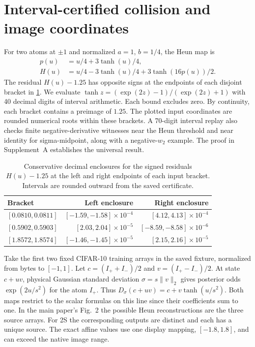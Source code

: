 \documentclass[10pt,twocolumn,letterpaper]{article}
\begin{document}
\section{Interval-certified collision and image coordinates}
\label{sec:exact}
For two atoms at $\pm1$ and normalized $a=1$, $b=1/4$, the Heun map is
\[
 \begin{aligned}
 p(u)&=u/4+3\tanh(u)/4,\\
 H(u)&=u/4-3\tanh(u)/4+3\tanh(16p(u))/2.
 \end{aligned}
\]
The residual $H(u)-1.25$ has opposite signs at the endpoints of each disjoint bracket in \cref{tab:brackets}. We evaluate $\tanh z=(\exp(2z)-1)/(\exp(2z)+1)$ with 40 decimal digits of interval arithmetic. Each bound excludes zero. By continuity, each bracket contains a preimage of $1.25$. The plotted input coordinates are rounded numerical roots within these brackets. A 70-digit interval replay also checks finite negative-derivative witnesses near the Heun threshold and near identity for sigma-midpoint, along with a negative-$w_2$ example. The proof in Supplement~A establishes the universal result.

\begin{table}[t]
\centering\footnotesize
\setlength{\tabcolsep}{2.5pt}
\begin{tabular}{@{}lrr@{}}\toprule
Bracket & Left enclosure & Right enclosure\\\midrule
$[0.0810,0.0811]$ & $[-1.59,-1.58]\times10^{-4}$ & $[4.12,4.13]\times10^{-4}$\\
$[0.5902,0.5903]$ & $[2.03,2.04]\times10^{-5}$ & $[-8.59,-8.58]\times10^{-6}$\\
$[1.8572,1.8574]$ & $[-1.46,-1.45]\times10^{-5}$ & $[2.15,2.16]\times10^{-5}$\\
\bottomrule\end{tabular}
\caption{Conservative decimal enclosures for the signed residuals $H(u)-1.25$ at the left and right endpoints of each input bracket. Intervals are rounded outward from the saved certificate.}
\label{tab:brackets}
\end{table}

Take the first two fixed CIFAR-10 training arrays in the saved fixture, normalized from bytes to $[-1,1]$. Let $c=(I_++I_-)/2$ and $v=(I_+-I_-)/2$. At state $c+uv$, physical Gaussian standard deviation $\sigma=s\|v\|_2$ gives posterior odds $\exp(2u/s^2)$ for the atom $I_+$. Thus $D_\sigma(c+uv)=c+v\tanh(u/s^2)$. Both maps restrict to the scalar formulas on this line since their coefficients sum to one. In the main paper's Fig.~2 the possible Heun reconstructions are the three source arrays. For 2S the corresponding outputs are distinct and each has a unique source. The exact affine values use one display mapping, $[-1.8,1.8]$, and can exceed the native image range.
\end{document}
